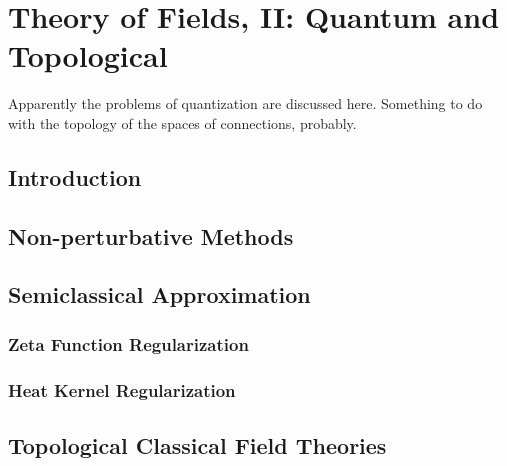 \chapter{Theory of Fields, II: Quantum and Topological}

Apparently the problems of quantization are discussed here. Something to do with the topology of the spaces of connections, probably.

\section{Introduction}

\section{Non-perturbative Methods}

\section{Semiclassical Approximation}

\subsection{Zeta Function Regularization}

\subsection{Heat Kernel Regularization}

\section{Topological Classical Field Theories}

